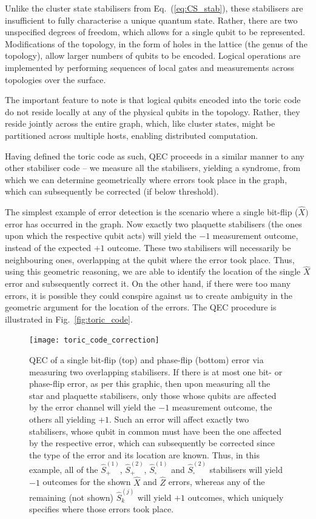 Unlike the cluster state stabilisers from Eq.~(\ref{eq:CS_stab}), these stabilisers are insufficient to fully characterise a unique quantum state. Rather, there are two unspecified degrees of freedom, which allows for a single qubit to be represented. Modifications of the topology, in the form of holes in the lattice (the genus of the topology), allow larger numbers of qubits to be encoded. Logical operations are implemented by performing sequences of local gates and measurements across topologies over the surface.

The important feature to note is that logical qubits encoded into the toric code do not reside locally at any of the physical qubits in the topology. Rather, they reside jointly across the entire graph, which, like cluster states, might be partitioned across multiple hosts, enabling distributed computation.

Having defined the toric code as such, QEC proceeds in a similar manner to any other stabiliser code -- we measure all the stabilisers, yielding a syndrome, from which we can determine geometrically where errors took place in the graph, which can subsequently be corrected (if below threshold).

The simplest example of error detection is the scenario where a single bit-flip ($\hat{X})$ error has occurred in the graph. Now exactly two plaquette stabilisers (the ones upon which the respective qubit acts) will yield the $-1$ measurement outcome, instead of the expected $+1$ outcome. These two stabilisers will necessarily be neighbouring ones, overlapping at the qubit where the error took place. Thus, using this geometric reasoning, we are able to identify the location of the single $\hat{X}$ error and subsequently correct it. On the other hand, if there were too many errors, it is possible they could conspire against us to create ambiguity in the geometric argument for the location of the errors. The QEC procedure is illustrated in Fig.~\ref{fig:toric_code}.

\begin{figure}[!htb]
	\texttt{[image: toric\_code\_correction]}
	\caption{QEC of a single bit-flip (top) and phase-flip (bottom) error via measuring two overlapping stabilisers. If there is at most one bit- or phase-flip error, as per this graphic, then upon measuring all the star and plaquette stabilisers, only those whose qubits are affected by the error channel will yield the $-1$ measurement outcome, the others all yielding $+1$. Such an error will affect exactly two stabilisers, whose qubit in common must have been the one affected by the respective error, which can subsequently be corrected since the type of the error and its location are known. Thus, in this example, all of the $\hat{S}_+^{(1)}$, $\hat{S}_+^{(2)}$, $\hat{S}_\square^{(1)}$ and $\hat{S}_\square^{(2)}$ stabilisers will yield $-1$ outcomes for the shown $\hat{X}$ and $\hat{Z}$ errors, whereas any of the remaining (not shown) $\hat{S}_k^{(j)}$ will yield $+1$ outcomes, which uniquely specifies where those errors took place.}\label{fig:toric_corr}	
\end{figure}

